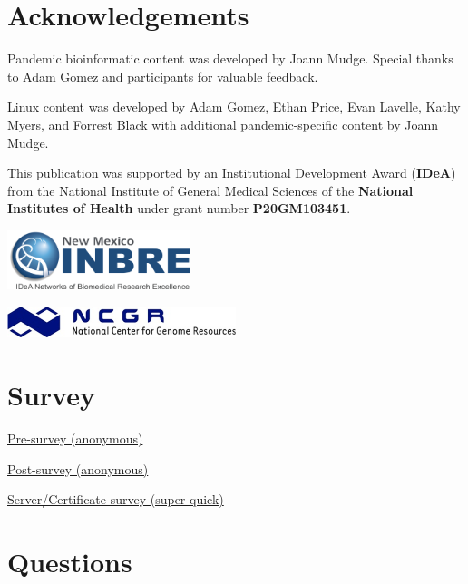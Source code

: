 \documentclass[
]{book}
\begin{document}
\hypertarget{acknowledgements}{%
\section{Acknowledgements}\label{acknowledgements}}

Pandemic bioinformatic content was developed by Joann Mudge. Special thanks to Adam Gomez and participants for valuable feedback.

Linux content was developed by Adam Gomez, Ethan Price, Evan Lavelle, Kathy Myers, and Forrest Black with additional pandemic-specific content by Joann Mudge.

This publication was supported by an Institutional Development Award (\textbf{IDeA}) from the National Institute of General Medical Sciences of the \textbf{National Institutes of Health} under grant number \textbf{P20GM103451}.

\includegraphics[width=0.4\textwidth,height=\textheight]{./Figures/INBRE_Logo_Grad_transparent-2019.png}

\includegraphics[width=0.5\textwidth,height=\textheight]{./Figures/ncgr.png}

\hypertarget{survey}{%
\section{Survey}\label{survey}}

\href{https://docs.google.com/forms/d/e/1FAIpQLSdrIJ03P_Zln5Z-GLfLCutasdktYFa_I9d1rglNBrC_oW7eMw/viewform?usp=sf_link}{Pre-survey (anonymous)}

\href{https://docs.google.com/forms/d/e/1FAIpQLSdTH8MVceEHCJdQf_8LdKKpILgL7Fi-7k3IGSzME93kq6YkfQ/viewform?usp=sf_link}{Post-survey (anonymous)}

\href{https://docs.google.com/forms/d/e/1FAIpQLSfGZwX2BL_ZyGgmvh4v41Q_886y-OiTESTbpvzoyR0J3BxC5Q/viewform?usp=sf_link}{Server/Certificate survey (super quick)}

\hypertarget{questions}{%
\section{Questions}\label{questions}}
\end{document}
